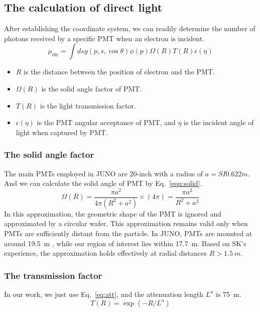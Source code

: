 \subsection{The calculation of direct light}
After establishing the coordinate system, we can readily determine the number of photons received by a specific PMT when an electron is incident.
\begin{equation}
	\mu_{\mathrm{dir}}=\int ds g(p,s,\cos\theta)\phi(p)\Omega(R)T(R)\epsilon(\eta)
	\label{equ:directLight}
\end{equation}
\begin{itemize}
	\item $R$ is the distance between the position of electron and the PMT.
	\item $\Omega(R)$ is the solid angle factor of PMT.
	\item $T(R)$ is the light transmission factor.
	\item $\epsilon(\eta)$ is the PMT angular acceptance of PMT, and $\eta$ is the incident angle of light when captured by PMT.
\end{itemize}

\subsubsection{The solid angle factor}
The main PMTs employed in JUNO are 20-inch with a radius of $a=SI{0.622}{m}$. And we can calculate the solid angle of PMT by Eq.~\eqref{equ:solid}.
\begin{equation}
	\Omega(R)=\frac{\pi a^2}{4\pi(R^2+a^2)}\times (4\pi)=\frac{\pi a^2}{R^2+a^2}
	\label{equ:solid}
\end{equation}
In this approximation, the geometric shape of the PMT is ignored and approximated by a circular wafer. This approximation remains valid only when PMTs are sufficiently distant from the particle. In JUNO, PMTs are mounted at around \SI{19.5}{m} , while our region of interest lies within \SI{17.7}{m}. Based on SK's experience, the approximation holds effectively at radial distances $R > \SI{1.5}{m}$.

\subsubsection{The transmission factor}
In our work, we just use Eq.~\eqref{eq:att}, and the attenuation length $L^{a}$ is \SI{75}{m}.
\begin{equation}
	T(R) = \exp(-R/L^{a})
	\label{eq:att}
\end{equation}

